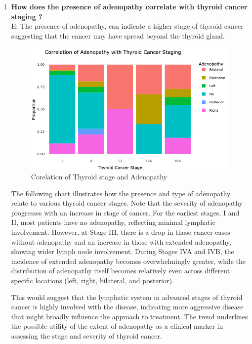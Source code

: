 \documentclass[12pt]{article}
\begin{document}
\begin{enumerate}



       \item \textbf{How does the presence of adenopathy correlate with thyroid cancer staging ?} \\
       E: The presence of adenopathy, can indicate a higher stage of thyroid cancer suggesting that the cancer may have spread beyond the thyroid gland.

 \begin{figure}[h]
        \vspace{5pt}
        \centering
        \includegraphics[width=1\textwidth]{adenopathy with satge.png}  
        \caption{Corelation of Thyroid stage and Adenopathy}
            \label{fig:example}
       \vspace{0.5cm}
    \end{figure}

    The following chart illustrates how the presence and type of adenopathy relate to various thyroid cancer stages. Note that the severity of adenopathy progresses with an increase in stage of cancer. For the earliest stages, I and II, most patients have no adenopathy, reflecting minimal lymphatic involvement. However, at Stage III, there is a drop in those cancer cases without adenopathy and an increase in those with extended adenopathy, showing wider lymph node involvement. During Stages IVA and IVB, the incidence of extended adenopathy becomes overwhelmingly greater, while the distribution of adenopathy itself becomes relatively even across different specific locations (left, right, bilateral, and posterior). 
    
    This would suggest that the lymphatic system in advanced stages of thyroid cancer is highly involved with the disease, indicating more aggressive disease that might broadly influence the approach to treatment. The trend underlines the possible utility of the extent of adenopathy as a clinical marker in assessing the stage and severity of thyroid cancer. 


\end{enumerate}
\end{document}
